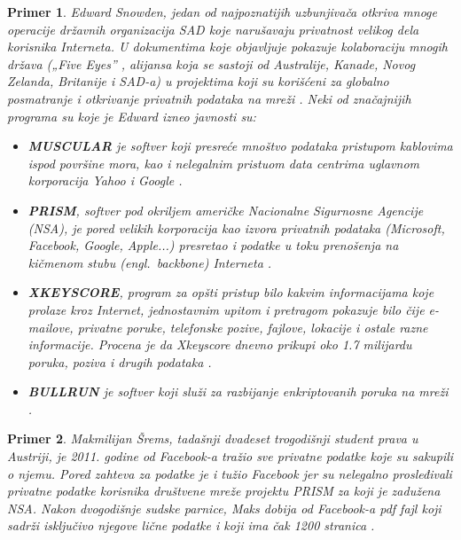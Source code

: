 \documentclass[a4paper]{article}
\newtheorem{primer}{Primer}[section]
\begin{document}
\begin{primer}
	Edward Snowden, jedan od najpoznatijih uzbunjivača otkriva mnoge operacije državnih organizacija SAD koje narušavaju privatnost velikog dela korisnika Interneta. U dokumentima koje objavljuje pokazuje kolaboraciju mnogih država („Five Eyes” , alijansa koja se sastoji od Australije, Kanade, Novog Zelanda, Britanije i SAD-a) u projektima koji su korišćeni za globalno posmatranje i otkrivanje privatnih podataka na mreži \cite{noPlaceToHide}. Neki od značajnijih programa su koje je Edward izneo javnosti su:
\begin{itemize}
	\item \textbf{MUSCULAR} je softver koji presreće mnoštvo podataka pristupom kablovima ispod površine mora, kao i nelegalnim pristuom data centrima uglavnom korporacija Yahoo i Google \cite{noPlaceToHide}.
	\item \textbf{PRISM}, softver pod okriljem američke Nacionalne Sigurnosne Agencije (NSA), je pored velikih korporacija kao izvora privatnih podataka (Microsoft, Facebook, Google, Apple...) presretao i podatke u toku prenošenja na kičmenom stubu (engl.~{\em backbone}) Interneta \cite{noPlaceToHide}.
	\item \textbf{XKEYSCORE}, program za opšti pristup bilo kakvim informacijama koje prolaze kroz Internet, jednostavnim upitom i pretragom pokazuje bilo čije e-mailove, privatne poruke, telefonske pozive, fajlove, lokacije i ostale razne informacije. Procena je da Xkeyscore dnevno prikupi oko 1.7 milijardu poruka, poziva i drugih podataka \cite{noPlaceToHide}.
	\item \textbf{BULLRUN} je softver koji služi za razbijanje enkriptovanih poruka na mreži \cite{noPlaceToHide}.
\end{itemize}
\end{primer}

\begin{primer}
	Makmilijan Šrems, tadašnji dvadeset trogodišnji student prava u
Austriji, je 2011. godine od Facebook-a tražio sve privatne podatke koje su sakupili o njemu. Pored zahteva za podatke je i tužio Facebook jer su nelegalno prosleđivali privatne podatke korisnika društvene mreže projektu PRISM\cite{noPlaceToHide} za koji je zadužena NSA. Nakon dvogodišnje sudske parnice, Maks dobija od Facebook-a pdf fajl koji sadrži isključivo njegove lične podatke i koji ima čak 1200 stranica \cite{marxSchremsFT}.
\end{primer}
\end{document}
